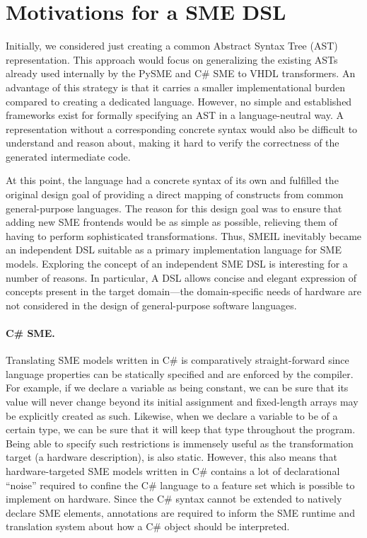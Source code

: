 \section{Motivations for a SME DSL}
\label{sec:smemot}

Initially, we considered just creating a common Abstract Syntax Tree (AST)
representation. This approach would focus on generalizing the existing ASTs
already used internally by the PySME and C\# SME to VHDL transformers. An
advantage of this strategy is that it carries a smaller implementational burden
compared to creating a dedicated language. However, no simple and established
frameworks exist for formally specifying an AST in a language-neutral way. A
representation without a corresponding concrete syntax would also be difficult
to understand and reason about, making it hard to verify the correctness of the
generated intermediate code.

At this point, the language had a concrete syntax of its own and fulfilled the
original design goal of providing a direct mapping of constructs from common
general-purpose languages. The reason for this design goal was to ensure that
adding new SME frontends would be as simple as possible, relieving them of
having to perform sophisticated transformations. Thus, SMEIL inevitably became
an independent DSL suitable as a primary implementation language for SME
models. Exploring the concept of an independent SME DSL is interesting for a
number of reasons. In particular, A DSL allows concise and elegant expression of
concepts present in the target domain---the domain-specific needs of hardware
are not considered in the design of general-purpose software languages.

\paragraph{C\# SME.}
Translating SME models written in C\# is comparatively straight-forward since
language properties can be statically specified and are enforced by the
compiler. For example, if we declare a variable as being constant, we can be
sure that its value will never change beyond its initial assignment and
fixed-length arrays may be explicitly created as such. Likewise, when we declare
a variable to be of a certain type, we can be sure that it will keep that type
throughout the program. Being able to specify such restrictions is immensely
useful as the transformation target (a hardware description), is also
static. However, this also means that hardware-targeted SME models written in
C\# contains a lot of declarational ``noise'' required to confine the C\#
language to a feature set which is possible to implement on hardware. Since the
C\# syntax cannot be extended to natively declare SME elements, annotations are
required to inform the SME runtime and translation system about how a C\# object
should be interpreted.



